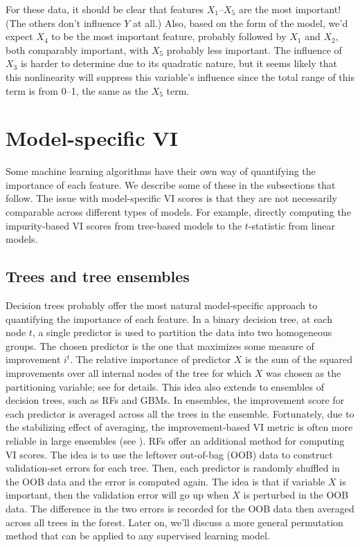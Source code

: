 For these data, it should be clear that features $X_1$--$X_5$ are the most important! (The others don't influence $Y$ at all.) Also, based on the form of the model, we'd expect $X_4$ to be the most important feature, probably followed by $X_1$ and $X_2$, both comparably important, with $X_5$ probably less important. The influence of $X_3$ is harder to determine due to its quadratic nature, but it seems likely that this nonlinearity will suppress this variable's influence since the total range of this term is from 0--1, the same as the $X_5$ term.


\section{Model-specific VI}

Some machine learning algorithms have their own way of quantifying the importance of each feature. We describe some of these in the subsections that follow. The issue with model-specific VI scores is that they are not necessarily comparable across different types of models. For example, directly computing the impurity-based VI scores from tree-based models to the $t$-statistic from linear models.

\subsection{Trees and tree ensembles}

Decision trees probably offer the most natural model-specific approach to quantifying the importance of each feature. In a binary decision tree, at each node $t$, a single predictor is used to partition the data into two homogeneous groups. The chosen predictor is the one that maximizes some measure of improvement $i^t$. The relative importance of predictor $X$ is the sum of the squared improvements over all internal nodes of the tree for which $X$ was chosen as the partitioning variable; see \citet{classification-breiman-1984} for details. This idea also extends to ensembles of decision trees, such as RFs and GBMs. In ensembles, the improvement score for each predictor is averaged across all the trees in the ensemble. Fortunately, due to the stabilizing effect of averaging, the improvement-based VI metric is often more reliable in large ensembles (see \citet[p. 368]{hastie-elements-2009}). RFs offer an additional method for computing VI scores. The idea is to use the leftover out-of-bag (OOB) data to construct validation-set errors for each tree. Then, each predictor is randomly shuffled in the OOB data and the error is computed again. The idea is that if variable $X$ is important, then the validation error will go up when $X$ is perturbed in the OOB data. The difference in the two errors is recorded for the OOB data then averaged across all trees in the forest. Later on, we'll discuss a more general permutation method that can be applied to any supervised learning model.

